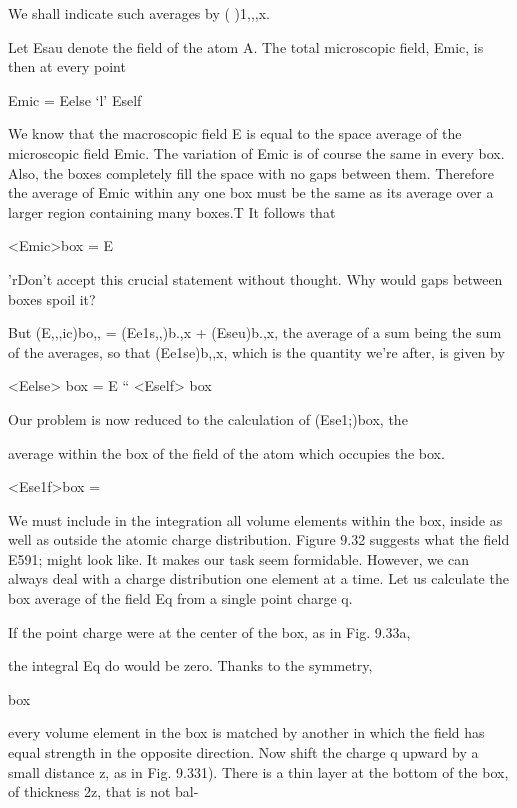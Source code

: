 {{We shall indicate such averages by ( )1,,,x.

Let Esau denote the field of the atom A. The total microscopic
field, Emic, is then at every point

Emic = Eelse ‘l' Eself 

We know that the macroscopic field E is equal to the space average
of the microscopic field Emic. The variation of Emic is of course the
same in every box. Also, the boxes completely fill the space with
no gaps between them. Therefore the average of Emic within any
one box must be the same as its average over a larger region containing
many boxes.T It follows that

<Emic>box = E 

'rDon't accept this crucial statement without thought. Why would gaps between
boxes spoil it?

But (E,,,ic)bo,, = (Ee1s,,)b.,x + (Eseu)b.,x, the average of a sum being
the sum of the averages, so that (Ee1se)b,,x, which is the quantity we're
after, is given by

\begin{equation}
\end{equation}
<Eelse> box = E `` <Eself> box 

Our problem is now reduced to the calculation of (Ese1;)box, the

average within the box of the field of the atom which occupies the
box.

\begin{equation}
\end{equation}
<Ese1f>box = %

We must include in the integration all volume elements within the
box, inside as well as outside the atomic charge distribution. Figure
9.32 suggests what the field E591; might look like. It makes our task
seem formidable. However, we can always deal with a charge distribution
one element at a time. Let us calculate the box average
of the field Eq from a single point charge q.

If the point charge were at the center of the box, as in Fig. 9.33a,

the integral Eq do would be zero. Thanks to the symmetry,

box

every volume element in the box is matched by another in which the
field has equal strength in the opposite direction. Now shift the
charge q upward by a small distance z, as in Fig. 9.331). There is a
thin layer at the bottom of the box, of thickness 2z, that is not bal-

}}
